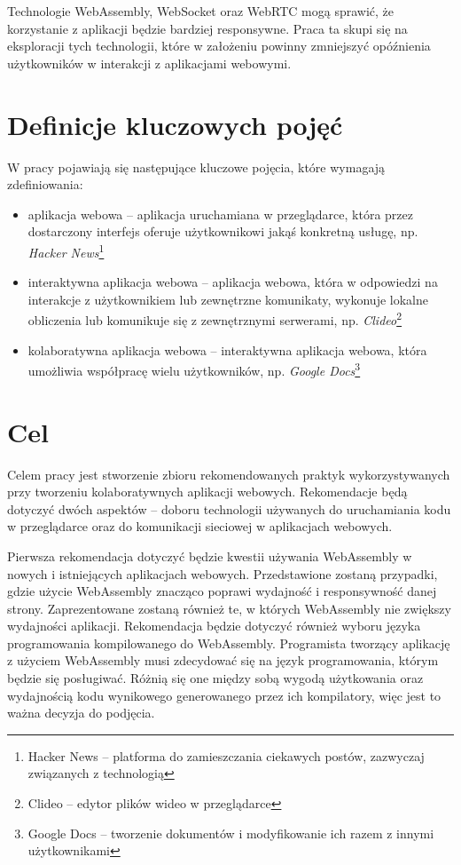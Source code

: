 \documentclass[language=polish,type=master]{aghmodern}
\begin{document}
Technologie WebAssembly, WebSocket oraz WebRTC mogą sprawić, że korzystanie z aplikacji będzie bardziej responsywne.
Praca ta skupi się na eksploracji tych technologii, które w założeniu powinny zmniejszyć opóźnienia użytkowników w interakcji z aplikacjami webowymi.

\section{Definicje kluczowych pojęć}
W pracy pojawiają się następujące kluczowe pojęcia, które wymagają zdefiniowania:
\begin{itemize}
    \item aplikacja webowa -- aplikacja uruchamiana w przeglądarce, która przez dostarczony interfejs oferuje użytkownikowi jakąś konkretną usługę, np. \emph{Hacker News}\footnote{Hacker News -- platforma do zamieszczania ciekawych postów, zazwyczaj związanych z technologią}
    \item interaktywna aplikacja webowa -- aplikacja webowa, która w odpowiedzi na interakcje z użytkownikiem lub zewnętrzne komunikaty, wykonuje lokalne obliczenia lub komunikuje się z zewnętrznymi serwerami, np. \emph{Clideo}\footnote{Clideo -- edytor plików wideo w przeglądarce}
    \item kolaboratywna aplikacja webowa -- interaktywna aplikacja webowa, która umożliwia współpracę wielu użytkowników, np. \emph{Google Docs}\footnote{Google Docs -- tworzenie dokumentów i modyfikowanie ich razem z innymi użytkownikami}
\end{itemize}

\section{Cel}
Celem pracy jest stworzenie zbioru rekomendowanych praktyk wykorzystywanych przy tworzeniu kolaboratywnych aplikacji webowych.
Rekomendacje będą dotyczyć dwóch aspektów -- doboru technologii używanych do uruchamiania kodu w przeglądarce oraz do komunikacji sieciowej w aplikacjach webowych.

Pierwsza rekomendacja dotyczyć będzie kwestii używania WebAssembly w nowych i istniejących aplikacjach webowych.
Przedstawione zostaną przypadki, gdzie użycie WebAssembly znacząco poprawi wydajność i responsywność danej strony.
Zaprezentowane zostaną również te, w których WebAssembly nie zwiększy wydajności aplikacji.
Rekomendacja będzie dotyczyć również wyboru języka programowania kompilowanego do WebAssembly.
Programista tworzący aplikację z użyciem WebAssembly musi zdecydować się na język programowania, którym będzie się posługiwać.
Różnią się one między sobą wygodą użytkowania oraz wydajnością kodu wynikowego generowanego przez ich kompilatory, więc jest to ważna decyzja do podjęcia.
\end{document}
